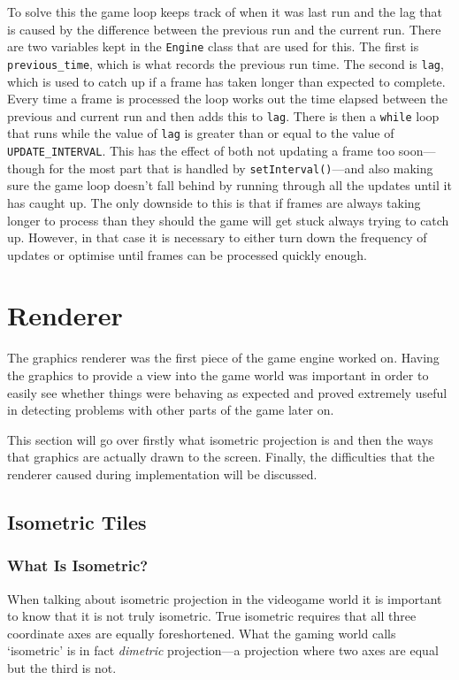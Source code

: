To solve this the game loop keeps track of when it was last run and the lag that is caused by the difference between the previous run and the current run. There are two variables kept in the \texttt{Engine} class that are used for this. The first is \texttt{previous\_time}, which is what records the previous run time. The second is \texttt{lag}, which is used to catch up if a frame has taken longer than expected to complete. Every time a frame is processed the loop works out the time elapsed between the previous and current run and then adds this to \texttt{lag}. There is then a \texttt{while} loop that runs while the value of \texttt{lag} is greater than or equal to the value of \texttt{UPDATE\_INTERVAL}. This has the effect of both not updating a frame too soon---though for the most part that is handled by \texttt{setInterval()}---and also making sure the game loop doesn't fall behind by running through all the updates until it has caught up. The only downside to this is that if frames are always taking longer to process than they should the game will get stuck always trying to catch up. However, in that case it is necessary to either turn down the frequency of updates or optimise until frames can be processed quickly enough.

\section{Renderer}
The graphics renderer was the first piece of the game engine worked on. Having the graphics to provide a view into the game world was important in order to easily see whether things were behaving as expected and proved extremely useful in detecting problems with other parts of the game later on.

This section will go over firstly what isometric projection is and then the ways that graphics are actually drawn to the screen. Finally, the difficulties that the renderer caused during implementation will be discussed.

\subsection{Isometric Tiles}

\subsubsection{What Is Isometric?}
When talking about isometric projection in the videogame world it is important to know that it is not truly isometric. True isometric requires that all three coordinate axes are equally foreshortened. What the gaming world calls `isometric' is in fact \textit{dimetric} projection---a projection where two axes are equal but the third is not.

